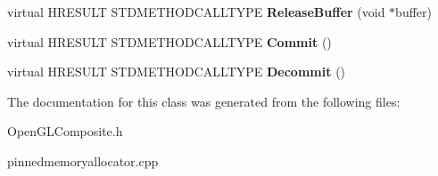 \begin{DoxyCompactItemize}
\item 
\hypertarget{classPinnedMemoryAllocator_a51521a04d32cc011d7bfb1e639521ef8}{
virtual HRESULT STDMETHODCALLTYPE {\bfseries ReleaseBuffer} (void $\ast$buffer)}
\label{classPinnedMemoryAllocator_a51521a04d32cc011d7bfb1e639521ef8}

\item 
\hypertarget{classPinnedMemoryAllocator_a536f2c73de3a20f61fe577c29ac067f6}{
virtual HRESULT STDMETHODCALLTYPE {\bfseries Commit} ()}
\label{classPinnedMemoryAllocator_a536f2c73de3a20f61fe577c29ac067f6}

\item 
\hypertarget{classPinnedMemoryAllocator_a11d0bf5a7d689293d3f2bdeb7ad980b2}{
virtual HRESULT STDMETHODCALLTYPE {\bfseries Decommit} ()}
\label{classPinnedMemoryAllocator_a11d0bf5a7d689293d3f2bdeb7ad980b2}

\end{DoxyCompactItemize}


The documentation for this class was generated from the following files:\begin{DoxyCompactItemize}
\item 
OpenGLComposite.h\item 
pinnedmemoryallocator.cpp\end{DoxyCompactItemize}
